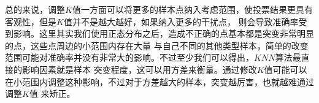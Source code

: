 \documentclass{article}
\begin{document}
总的来说，调整$K$值一方面可以将更多的样本点纳入考虑范围，使投票结果更具有客观性，但是$K$值并不是越大越好，如果纳入更多的干扰点，
则会导致准确率受到影响。这里其实我们使用正态分布之后，造成不正确的点基本都是突变非常明显的点，这些点周边的小范围内存在大量
与自己不同的其他类型样本，简单的改变范围可能对准确率并没有非常大的影响。不过至少我们可以得出，$KNN$算法最直接的影响因素就是样本
突变程度，这可以用方差来衡量。通过修改$K$值可能可以在小范围内调整这种影响，不过对于方差越大的样本，突变越厉害，也就越难通过调整$K$值
来矫正。
\end{document}
